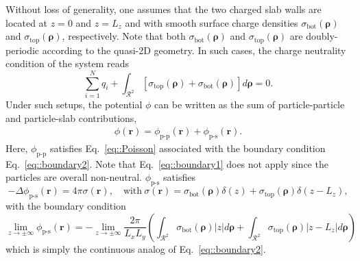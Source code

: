Without loss of generality, one assumes that the two charged slab walls are located at $z=0$ and $z=L_z$ and with smooth surface charge densities $\sigma_{\mathrm{bot}}(\bm{\rho})$ and $\sigma_{\mathrm{top}}(\bm{\rho})$, respectively. Note that both $\sigma_{\mathrm{bot}}(\bm{\rho})$ and $\sigma_{\mathrm{top}}(\bm{\rho})$ are doubly-periodic according to the quasi-2D geometry. In such cases, the charge neutrality condition of the system reads
\begin{equation}\label{eq::chargeneu}
 	\sum_{i=1}^{N}q_{i} + \int_{\mathcal{R}^2} \left[\sigma_{\mathrm{top}} (\bm{\rho}) + \sigma_{\mathrm{bot}}(\bm{\rho}) \right] d\bm{\rho} = 0.
\end{equation} 
Under such setups, the potential $\phi$ can be written as the sum of particle-particle and particle-slab contributions,
\begin{align}
	\phi(\bm{r})=\phi_{\text{p-p}}(\bm{r})+\phi_{\text{p-s}}(\bm{r}).
\end{align}
Here, $\phi_{\text{p-p}}$ satisfies Eq.~\eqref{eq::Poisson} associated with the boundary condition Eq.~\eqref{eq::boundary2}. Note that Eq.~\eqref{eq::boundary1} does not apply since the particles are overall non-neutral. $\phi_{\text{p-s}}$ satisfies 
\begin{equation}\label{eq::PoionWall}
	-\Delta \phi_{\text{p-s}}(\bm{r}) = 4\pi \sigma(\bm{r}), \quad \text{with}~ \sigma(\bm{r}) =  \sigma_{\mathrm{bot}}(\bm{\rho}) \delta(z) + \sigma_{\mathrm{top}}(\bm{\rho}) \delta(z-L_z),
\end{equation}
with the boundary condition
\begin{equation}\label{eq::boundionwall}
	\lim_{z\rightarrow\pm\infty}\phi_{\text{p-s}}(\bm{r})=-\lim_{z\rightarrow\pm\infty} \frac{2\pi}{L_xL_y}\left(\int_{\mathcal{R}^2}\sigma_{\mathrm{bot}}(\bm{\rho})|z|d\bm{\rho}+\int_{\mathcal{R}^2}\sigma_{\mathrm{top}}(\bm{\rho})|z-L_z|d\bm{\rho}\right)
\end{equation}
which is simply the continuous analog of Eq.~\eqref{eq::boundary2}. 

